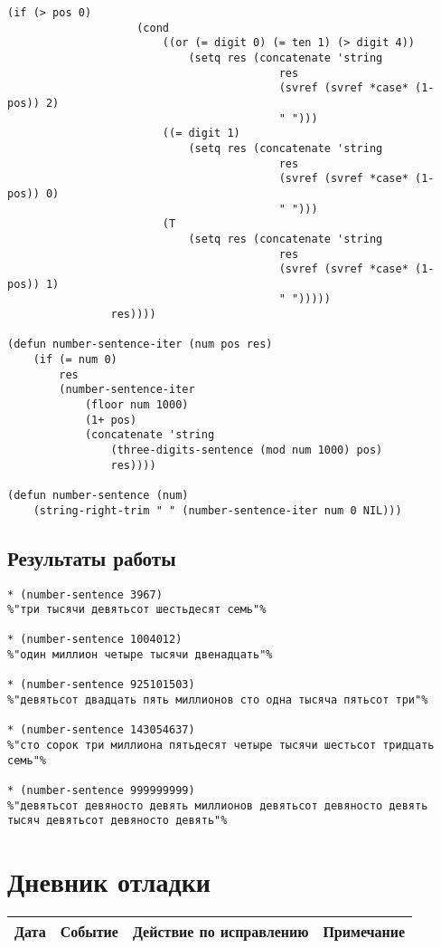 \documentclass[12pt]{article}
\begin{document}
\begin{lstlisting}[escapechar=\%, basicstyle=\footnotesize]
                (if (> pos 0)
                    (cond
                        ((or (= digit 0) (= ten 1) (> digit 4)) 
                            (setq res (concatenate 'string 
                                          res 
                                          (svref (svref *case* (1- pos)) 2) 
                                          " ")))
                        ((= digit 1) 
                            (setq res (concatenate 'string 
                                          res 
                                          (svref (svref *case* (1- pos)) 0) 
                                          " ")))
                        (T 
                            (setq res (concatenate 'string 
                                          res 
                                          (svref (svref *case* (1- pos)) 1) 
                                          " ")))))
                res))))

(defun number-sentence-iter (num pos res)
    (if (= num 0)
        res
        (number-sentence-iter
            (floor num 1000)
            (1+ pos)
            (concatenate 'string
                (three-digits-sentence (mod num 1000) pos)
                res))))

(defun number-sentence (num)
    (string-right-trim " " (number-sentence-iter num 0 NIL)))
\end{lstlisting}

\subsection{Результаты работы}
\begin{lstlisting}[escapechar=\%]
* (number-sentence 3967)
%"три тысячи девятьсот шестьдесят семь"%

* (number-sentence 1004012)
%"один миллион четыре тысячи двенадцать"%

* (number-sentence 925101503)
%"девятьсот двадцать пять миллионов сто одна тысяча пятьсот три"%

* (number-sentence 143054637)
%"сто сорок три миллиона пятьдесят четыре тысячи шестьсот тридцать семь"%

* (number-sentence 999999999)
%"девятьсот девяносто девять миллионов девятьсот девяносто девять тысяч девятьсот девяносто девять"%
\end{lstlisting}

\section{Дневник отладки}
\begin{tabular}{|c|c|c|c|}
\hline
Дата & Событие & Действие по исправлению & Примечание \\
\hline
\end{tabular}
\end{document}
